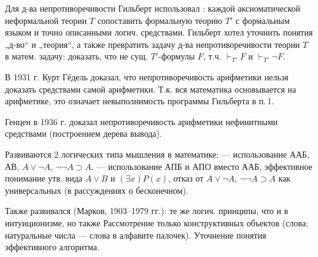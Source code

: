 Для д-ва непротиворечивости Гильберт использовал : каждой аксиоматической неформальной теории $T$ сопоставить формальную теорию $T'$ с формальным языком и точно описанными логич. средствами. Гильберт хотел уточнить понятия „д-во“ и „теория“, а также превратить задачу д-ва непротиворечивости теории $T$ в матем. задачу: доказать, что не сущ. $T'$-формулы $F$, т.ч. $\vdash_{T'}F$ и $\vdash_{T'}\neg F$.\par\vspace{1mm}
\par
В 1931 г. Курт Гёдель доказал, что непротиворечивость арифметики нельзя доказать средствами самой арифметики. Т.к. вся математика основывается на арифметике, это означает невыполнимость программы Гильберта в п.\,1.\par
Генцен в 1936 г. доказал непротиворечивость арифметики нефинитными средствами (построением дерева вывода).\par
Развиваются 2 логических типа мышления в математике:
  --- использование ААБ, АВ, $A\vee\neg A$, $\neg\neg A\supset A$.
  --- использование АПБ и АПО вместо ААБ, эффективное понимание утв. вида $A\vee B$ и $(\exists x)P(x)$, отказ от $A\vee\neg A$, $\neg\neg A\supset A$ как универсальных (в рассуждениях о бесконечном).\par
Также развивался  (Марков, 1903--1979 гг.): те же логич. принципы, что и в интуиционизме, но также
 Рассмотрение только конструктивных объектов (слова; натуральные числа --- слова в алфавите палочек).
 Уточнение понятия эффективного алгоритма.\par

